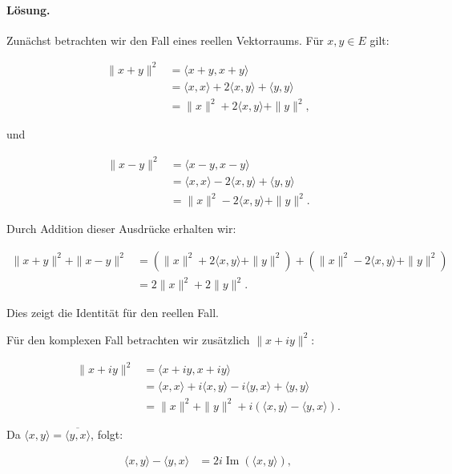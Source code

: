 \documentclass[11pt,a4paper]{article}
\begin{document}
\paragraph{Lösung.}

Zunächst betrachten wir den Fall eines reellen Vektorraums. Für $x, y \in E$ gilt:

\begin{align*}
\|x+y\|^2 &= \langle x+y, x+y \rangle \\
&= \langle x, x \rangle + 2 \langle x, y \rangle + \langle y, y \rangle \\
&= \|x\|^2 + 2 \langle x, y \rangle + \|y\|^2,
\end{align*}

und

\begin{align*}
\|x-y\|^2 &= \langle x-y, x-y \rangle \\
&= \langle x, x \rangle - 2 \langle x, y \rangle + \langle y, y \rangle \\
&= \|x\|^2 - 2 \langle x, y \rangle + \|y\|^2.
\end{align*}

Durch Addition dieser Ausdrücke erhalten wir:

\begin{align*}
\|x+y\|^2 + \|x-y\|^2 &= (\|x\|^2 + 2 \langle x, y \rangle + \|y\|^2) + (\|x\|^2 - 2 \langle x, y \rangle + \|y\|^2) \\
&= 2\|x\|^2 + 2\|y\|^2.
\end{align*}

Dies zeigt die Identität für den reellen Fall.

Für den komplexen Fall betrachten wir zusätzlich $\|x+iy\|^2$:

\begin{align*}
\|x+iy\|^2 &= \langle x+iy, x+iy \rangle \\
&= \langle x, x \rangle + i \langle x, y \rangle - i \langle y, x \rangle + \langle y, y \rangle \\
&= \|x\|^2 + \|y\|^2 + i(\langle x, y \rangle - \langle y, x \rangle).
\end{align*}

Da $\langle x, y \rangle = \overline{\langle y, x \rangle}$, folgt:

\begin{align*}
\langle x, y \rangle - \langle y, x \rangle &= 2i \operatorname{Im}(\langle x, y \rangle),
\end{align*}
\end{document}
